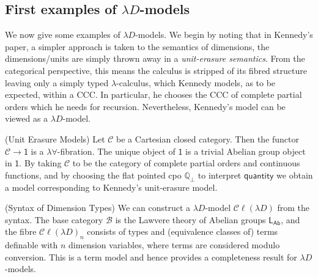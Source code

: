\documentclass[a4paper,UKenglish]{lipics}
\newcommand{\ra}{\rightarrow}
\newcommand{\msf}[1]{\mathsf{#1}} %
\newcommand{\LAb}{\msf{L}_{\msf{Ab}}}
\newcommand{\terminal}{\msf{1}}
\newcommand{\ClLD}{\mathcal{C\ell}(\lambda{}D)} %
\newcommand{\B}{\mathcal{B}}
\newcommand{\C}{\mathcal{C}}
\newcommand{\bbQ}{\mathbb{Q}}
\newcommand{\qnt}{\msf{quantity}}
\begin{document}
\subsection{First examples of $\lambda D$-models}
We now give some examples of $\lambda D$-models. We begin by noting that in Kennedy's paper, a simpler approach is taken to the semantics of dimensions, the dimensions/units are simply thrown away in a {\em unit-erasure semantics}. From the categorical perspective, this means the calculus is stripped of its fibred structure leaving only a simply typed $\lambda$-calculus, which Kennedy models, as to be expected, within a CCC. In particular, he chooses the CCC of complete partial orders which he needs for recursion. Nevertheless, Kennedy's model can be viewed as a $\lambda D$-model.


\begin{example}(Unit Erasure Models)
\label{ex:UnitErasure}
Let $\C$ be a Cartesian closed category. Then the functor $\C \ra \terminal$ is a $\lambda\forall$-fibration. The unique object of $\terminal$ is a trivial Abelian group object in $\terminal$. By taking $\C$ to be the category of complete partial orders and continuous functions, and by choosing the flat pointed cpo $\bbQ_{\bot}$ to interpret $\qnt$ we obtain a model corresponding to Kennedy's unit-erasure model.
\end{example}


\begin{example}(Syntax of Dimension Types)
We can construct a $\lambda D$-model $\ClLD$ from the syntax. The base category $\B$ is the Lawvere theory of Abelian groups $\LAb$, and the fibre $\ClLD_n$ consists of types and (equivalence classes of) terms definable with $n$ dimension variables, where terms are considered modulo conversion. This is a term model and hence provides a completeness result for $\lambda D$-models.
\end{example}
\end{document}
